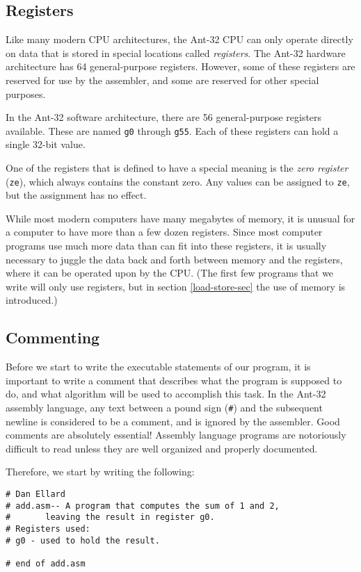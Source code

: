 \subsection{Registers}

Like many modern CPU architectures, the Ant-32 CPU can only
operate directly on data that is stored in special locations called
{\em registers}.  The Ant-32 hardware architecture has 64
general-purpose registers.  However, some of these registers are
reserved for use by the assembler, and some are reserved for other
special purposes.

In the Ant-32 software architecture, there are 56
general-purpose registers available.  These are named {\tt g0} through
{\tt g55}.  Each of these registers can hold a single 32-bit value.

One of the registers that is defined to have a special meaning is
the {\em zero register} ({\tt ze}), which always contains the constant
zero.  Any values can be assigned to {\tt ze}, but the assignment has
no effect.

While most modern computers have many megabytes of memory, it is
unusual for a computer to have more than a few dozen registers.  Since
most computer programs use much more data than can fit into these
registers, it is usually necessary to juggle the data back and forth
between memory and the registers, where it can be operated upon by the
CPU.  (The first few programs that we write will only use registers,
but in section \ref{load-store-sec} the use of memory is introduced.)

\subsection{Commenting}

Before we start to write the executable statements of our program,
it is important to write a comment that describes what the
program is supposed to do, and what algorithm will be used to
accomplish this task.  In the Ant-32 assembly language, any text
between a pound sign ({\tt \#}) and the subsequent newline is
considered to be a comment, and is ignored by the assembler.  Good
comments are absolutely essential!  Assembly language programs are
notoriously difficult to read unless they are well organized and
properly documented.

Therefore, we start by writing the following:

{\codesize
\begin{verbatim}
# Dan Ellard
# add.asm-- A program that computes the sum of 1 and 2,
#       leaving the result in register g0.
# Registers used:
# g0 - used to hold the result.

# end of add.asm
\end{verbatim}}

